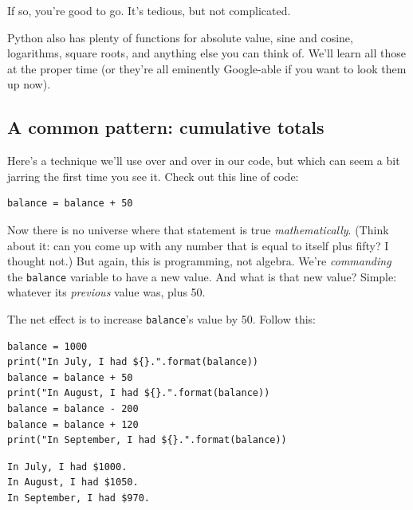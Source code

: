 \vspace{-.15in}

If so, you're good to go. It's tedious, but not complicated.

Python also has plenty of functions for absolute value, sine and cosine,
logarithms, square roots, and anything else you can think of. We'll learn all
those at the proper time (or they're all eminently Google-able if you want to
look them up now).

\subsection{A common pattern: cumulative totals}

\label{cumulativeTotal}

Here's a technique we'll use over and over in our code, but which can seem a
bit jarring the first time you see it. Check out this line of code:

\begin{Verbatim}[fontsize=\small,samepage=true,frame=single,framesep=3mm]
balance = balance + 50
\end{Verbatim}

Now there is no universe where that statement is true \textit{mathematically}.
(Think about it: can you come up with any number that is equal to itself plus
fifty? I thought not.) But again, this is programming, not algebra. We're
\textit{commanding} the \texttt{balance} variable to have a new value. And what
is that new value? Simple: whatever its \textit{previous} value was, plus 50.

The net effect is to increase \texttt{balance}'s value by 50. Follow this:

\begin{Verbatim}[fontsize=\small,samepage=true,frame=single,framesep=3mm]
balance = 1000
print("In July, I had ${}.".format(balance))
balance = balance + 50
print("In August, I had ${}.".format(balance))
balance = balance - 200
balance = balance + 120
print("In September, I had ${}.".format(balance))
\end{Verbatim}
\vspace{-.2in}

\begin{Verbatim}[fontsize=\small,samepage=true,frame=leftline,framesep=5mm,framerule=1mm]
In July, I had $1000.
In August, I had $1050.
In September, I had $970.
\end{Verbatim}


